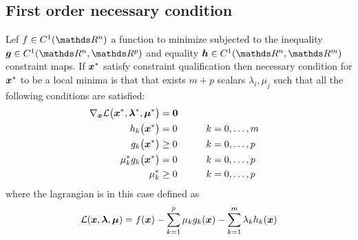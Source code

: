 	\subsection{First order necessary condition} Lef $f\in C^1(\R^n)$ a function to minimize subjected to the inequality $\vett g\in C^1(\R^n,\R^p)$ and equality $\vett h \in C^1(\R^n,\R^m)$ constraint maps. If $\boldsymbol{x}^*$ satisfy constraint qualification then necessary condition for $\boldsymbol{x}^*$ to be a local minima is that that exists $m+p$ scalars $\lambda_i,\mu_j$ such that all the following conditions are satisfied:
	\begin{equation} \label{eq:min:kkt:firstnecessary}
	\begin{aligned}
		\nabla_{\boldsymbol{x}} \mathcal L \big(\boldsymbol{x}^*,\boldsymbol{\lambda}^*,\boldsymbol{\mu}^*\big) & = \boldsymbol{0} \\
		h_k\big(\boldsymbol{x}^*\big) & =  0 \qquad && k = 0,\dots, m\\
		g_k\big(\boldsymbol{x}^*\big) & \geq 0 && k = 0,\dots, p \\
		\mu_k^* g_k\big(\boldsymbol{x}^*\big) & = 0 && k = 0,\dots, p \\
		\mu_k^* & \geq 0 && k = 0,\dots,p
	\end{aligned}
	\end{equation}
	where the lagrangian is in this case defined as
	\[ \mathcal L(\boldsymbol{x},\boldsymbol{\lambda},\boldsymbol{\mu}) = f(\boldsymbol{x}) - \sum_{k=1}^p \mu_k g_k(\boldsymbol{x})  - \sum_{k=1}^m \lambda_k h_k(\boldsymbol{x}) \]
	
